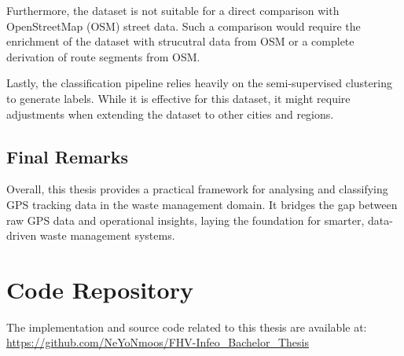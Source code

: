 \documentclass[a4paper,12pt,twoside]{scrreprt}
\begin{document}
Furthermore, the dataset is not suitable for a direct comparison with
OpenStreetMap (OSM) street data. Such a comparison would require the enrichment
of the dataset with strucutral data from OSM or a complete derivation of route
segments from OSM.

Lastly, the classification pipeline relies heavily on the semi-supervised
clustering
to generate labels. While it is effective for this dataset, it might require
adjustments
when extending the dataset to other cities and regions.

\section{Final Remarks}
Overall, this thesis provides a practical framework for analysing and
classifying GPS tracking data in the waste management domain. It bridges the
gap between raw GPS data and operational insights,
laying the foundation for smarter, data-driven waste management systems.

\clearpage
{}
{}
\printbibliography

\appendix
\chapter{Code Repository}
The implementation and source code related to this thesis are available at:
\url{https://github.com/NeYoNmoos/FHV-Infeo_Bachelor_Thesis}
\end{document}
